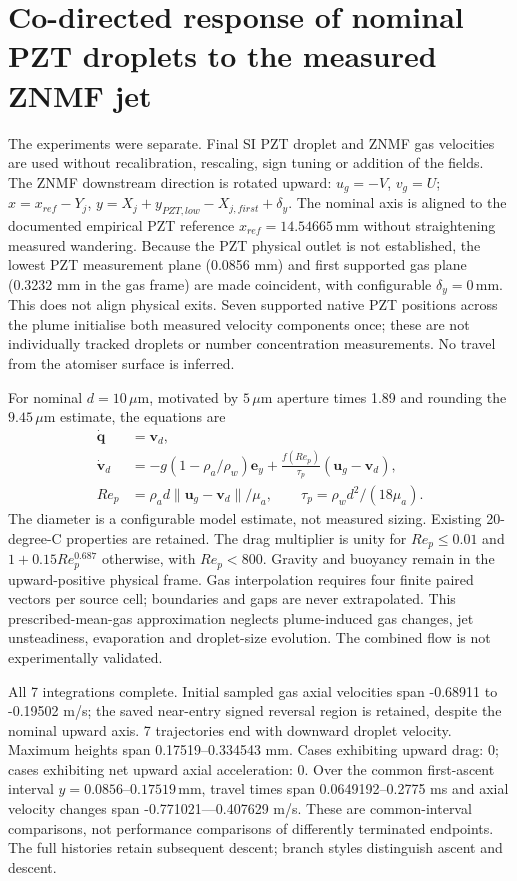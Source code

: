 \section{Co-directed response of nominal PZT droplets to the measured ZNMF jet}
The experiments were separate. Final SI PZT droplet and ZNMF gas velocities are
used without recalibration, rescaling, sign tuning or addition of the fields.
The ZNMF downstream direction is rotated upward: $u_g=-V$, $v_g=U$;
$x=x_{ref}-Y_j$, $y=X_j+y_{PZT,low}-X_{j,first}+\delta_y$.
The nominal axis is aligned to the documented empirical PZT reference
$x_{ref}=14.54665\,$mm without straightening measured wandering.
Because the PZT physical outlet is not established, the lowest PZT measurement
plane (0.0856 mm) and first supported gas plane
(0.3232 mm in the gas frame) are made coincident,
with configurable $\delta_y=0\,$mm. This does not align physical exits.
Seven supported native PZT positions across the plume initialise both measured
velocity components once; these are not individually tracked droplets or number
concentration measurements. No travel from the atomiser surface is inferred.

For nominal $d=10\,\mu$m, motivated by $5\,\mu$m aperture times 1.89 and
rounding the $9.45\,\mu$m estimate, the equations are
\begin{align}
\dot{\boldsymbol q}&=\boldsymbol v_d,\\
\dot{\boldsymbol v}_d&=-g(1-\rho_a/\rho_w)\boldsymbol e_y+
\frac{f(Re_p)}{\tau_p}(\boldsymbol u_g-\boldsymbol v_d),\\
Re_p&=\rho_a d\lVert\boldsymbol u_g-\boldsymbol v_d\rVert/\mu_a,
\qquad\tau_p=\rho_w d^2/(18\mu_a).
\end{align}
The diameter is a configurable model estimate, not measured sizing. Existing
20-degree-C properties are retained. The drag multiplier is unity for $Re_p\leq0.01$
and $1+0.15Re_p^{0.687}$ otherwise, with $Re_p<800$. Gravity and buoyancy
remain in the upward-positive physical frame. Gas interpolation requires four
finite paired vectors per source cell; boundaries and gaps are never extrapolated.
This prescribed-mean-gas approximation neglects plume-induced gas changes, jet
unsteadiness, evaporation and droplet-size evolution. The combined flow is not
experimentally validated.

All 7 integrations complete. Initial sampled gas axial velocities
span -0.68911 to -0.19502 m/s;
the saved near-entry signed reversal region is retained, despite the nominal upward axis.
7 trajectories end with downward droplet velocity. Maximum heights
span 0.17519--0.334543 mm.
Cases exhibiting upward drag: 0; cases exhibiting
net upward axial acceleration: 0.
Over the common first-ascent interval $y=0.0856$--$0.17519\,$mm,
travel times span 0.0649192--0.2775 ms and axial velocity changes
span -0.771021---0.407629 m/s. These are common-interval comparisons, not
performance comparisons of differently terminated endpoints. The full histories
retain subsequent descent; branch styles distinguish ascent and descent.

